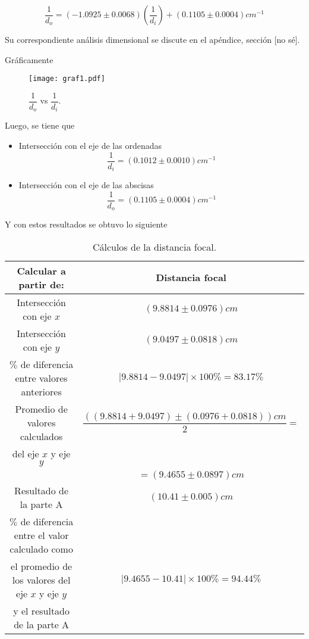 \documentclass[a4paper, 10pt]{article}
\begin{document}
	$$\dfrac{1}{d_o}=(-1.0925\pm 0.0068)\left(\dfrac{1}{d_i}\right)+(0.1105\pm 0.0004)cm^{-1}$$
	
	Su correspondiente análisis dimensional se discute en el apéndice, sección [no sé]. 
	
	Gráficamente
	
	\begin{figure}[ht]
		\centering
		\texttt{[image: graf1.pdf]}
		\caption{$\dfrac{1}{d_o}$ vs \(\dfrac{1}{d_i}\).}
		\label{fig:identidad}
	\end{figure}
	
	Luego, se tiene que
	
	\begin{multicols}{2}
		\begin{itemize}
			\item Intersección con el eje de las ordenadas
			$$\dfrac{1}{d_i}=(0.1012\pm 0.0010) cm^{-1}$$
			
			\item Intersección con el eje de las abscisas
			$$\dfrac{1}{d_o}=(0.1105\pm 0.0004) cm^{-1} $$
		\end{itemize}
	\end{multicols}
	
	Y con estos resultados se obtuvo lo siguiente	
	\newpage
		
	\begin{table}[ht]
		\centering
		\caption{Cálculos de la distancia focal.}
		\begin{tabular}{|c|c|}
		\hline
		Calcular a partir de: & Distancia focal \\
		\hline
		Intersección con eje $x$ & $(9.8814\pm0.0976)cm$\\ 
		\hline
		Intersección con eje $y$ & $(9.0497\pm 0.0818)cm$\\ 
		\hline
		$\%$ de diferencia entre valores anteriores & $|9.8814-9.0497|\times 100\% =83.17\% $\\
		\hline
		Promedio de valores calculados  & $\dfrac{((9.8814+9.0497)\pm (0.0976+0.0818))cm}{2}=$\\
		del eje $x$ y eje $y$ & \\
		& $=(9.4655\pm 0.0897)cm$ \\
		\hline
		Resultado de la parte A & $(10.41\pm0.005) cm$ \\
		\hline
		$\%$ de diferencia entre el valor calculado como & \\
		el promedio de los valores del eje $x$ y eje $y$ & $|9.4655-10.41|\times 100\% =94.44\%$ \\
		y el resultado de la parte A & \\
		\hline
	\end{tabular}
	\end{table}
\end{document}
